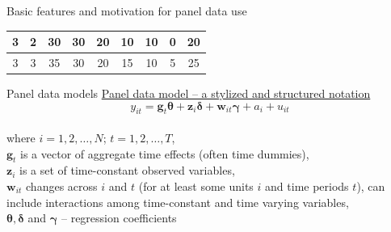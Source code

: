 \documentclass[usenames,dvipsnames]{beamer}
\begin{document}
\begin{frame}{Basic features and motivation for panel data use}
\begin{table}[]
{\begin{tabular}{|c|c|c|c|c|c|c|c|c|}
3   & 2    & 30       & 30                                                        & 20                                                     & 10                                                          & 10                                                          & 0                                                          & 20                                                                      \\ \hline
3   & 3    & 35       & 30                                                        & 20                                                     & 15                                                          & 10                                                          & 5                                                          & 25                                                                      \\ \hline
\end{tabular}}
\end{table}
\end{frame}
\begin{frame}{Panel data models}
\underline{Panel data model -- a stylized and structured notation } \\
\medskip
$$y_{it} = \bm{g}_t \bm{\theta} + \bm{z}_i \bm{\delta} + \bm{w}_{it} \bm{\gamma} + a_i + u_{it}$$\\
\medskip
where \quad $i = 1,2, \dots, N$; $t = 1, 2, \dots, T$, \\
\medskip
$\bm{g}_t$ is a vector of aggregate time effects (often time dummies),\\
\medskip
$\bm{z}_i$ is a set of time-constant observed variables, \\
\medskip
$\bm{w}_{it}$ changes across $i$ and $t$ (for at least some units $i$ and time periods $t$), can include interactions among time-constant and time varying variables, \\
\medskip
$\bm{\theta, \delta}$ and $\bm{\gamma}$ -- regression coefficients 
\end{frame}
\end{document}
